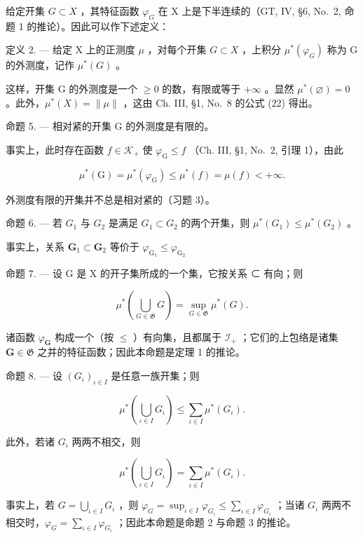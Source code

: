 给定开集 \(G \subset X\) ，其特征函数 \(\varphi_{G}\) 在 X 上是下半连续的（GT, IV, §6, No.~2, 命题 1 的推论）。因此可以作下述定义：

定义 2. --- 给定 X 上的正测度 \(\mu\) ，对每个开集 \(G \subset X\) ，上积分 \(\mu^{*}(\varphi_{G})\) 称为 G 的外测度，记作 \(\mu^{*}(G)\) 。

这样，开集 G 的外测度是一个 \(\geqslant0\) 的数，有限或等于 \(+\infty\) 。显然 \(\mu^{*}(\varnothing)=0\) 。此外，\(\mu^{*}(X)=\|\mu\|\) ，这由 Ch. III, §1, No.~8 的公式 (22) 得出。

命题 5. --- 相对紧的开集 G 的外测度是有限的。

事实上，此时存在函数 \(f \in \mathcal{K}_+\) 使 \(\varphi_{\mathrm{G}} \leqslant f\) （Ch. III, §1, No.~2, 引理 1），由此

\[
\mu^ {*} (\mathrm{G}) = \mu^ {*} (\varphi_ {\mathrm{G}}) \leqslant \mu^ {*} (f) = \mu (f) <   + \infty .
\]

外测度有限的开集并不总是相对紧的（习题 3）。

命题 6. --- 若 \(G_1\) 与 \(G_2\) 是满足 \(G_1 \subset G_2\) 的两个开集，则 \(\mu^*(G_1) \leqslant \mu^*(G_2)\) 。

事实上，关系 \(\mathbf{G}_1\subset \mathbf{G}_2\) 等价于 \(\varphi_{\mathrm{G_1}}\leqslant \varphi_{\mathrm{G_2}}\)

命题 7. --- 设 G 是 X 的开子集所成的一个集，它按关系 ⊂ 有向；则

\[
\mu^ {*} \left(\bigcup_ {G \in \mathfrak {G}} G\right) = \sup _ {G \in \mathfrak {G}} \mu^ {*} (G).\tag{5}
\]

诸函数 \(\varphi_{\mathbf{G}}\) 构成一个（按 \(\leqslant\) ）有向集，且都属于 \(\mathcal{I}_{+}\) ；它们的上包络是诸集 \(\mathbf{G} \in \mathfrak{G}\) 之并的特征函数；因此本命题是定理 1 的推论。

命题 8. --- 设 \((G_{\iota})_{\iota \in I}\) 是任意一族开集；则

\[
\mu^ {*} \left(\bigcup_ {\iota \in I} G _ {\iota}\right) \leqslant \sum_ {\iota \in I} \mu^ {*} (G _ {\iota}).\tag{6}
\]

此外，若诸 \(G_{\iota}\) 两两不相交，则

\[
\mu^ {*} \left(\bigcup_ {\iota \in I} G _ {\iota}\right) = \sum_ {\iota \in I} \mu^ {*} (G _ {\iota}).\tag{7}
\]

事实上，若 \(G = \bigcup_{\iota \in I} G_{\iota}\) ，则 \(\varphi_{G} = \sup_{\iota \in I} \varphi_{G_{\iota}} \leqslant \sum_{\iota \in I} \varphi_{G_{\iota}}\) ；当诸 \(G_{\iota}\) 两两不相交时，\(\varphi_{G} = \sum_{\iota \in I} \varphi_{G_{\iota}}\) ；因此本命题是命题 2 与命题 3 的推论。

